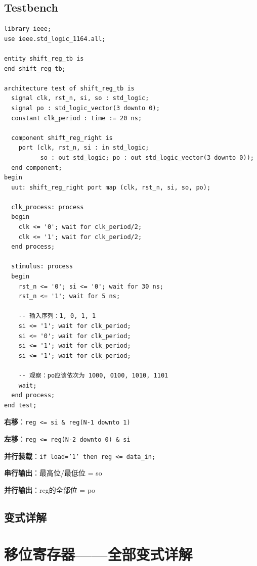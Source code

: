 \section{Testbench}

\begin{lstlisting}[caption={移位寄存器Testbench}]
library ieee;
use ieee.std_logic_1164.all;

entity shift_reg_tb is
end shift_reg_tb;

architecture test of shift_reg_tb is
  signal clk, rst_n, si, so : std_logic;
  signal po : std_logic_vector(3 downto 0);
  constant clk_period : time := 20 ns;

  component shift_reg_right is
    port (clk, rst_n, si : in std_logic;
          so : out std_logic; po : out std_logic_vector(3 downto 0));
  end component;
begin
  uut: shift_reg_right port map (clk, rst_n, si, so, po);

  clk_process: process
  begin
    clk <= '0'; wait for clk_period/2;
    clk <= '1'; wait for clk_period/2;
  end process;

  stimulus: process
  begin
    rst_n <= '0'; si <= '0'; wait for 30 ns;
    rst_n <= '1'; wait for 5 ns;

    -- 输入序列：1, 0, 1, 1
    si <= '1'; wait for clk_period;
    si <= '0'; wait for clk_period;
    si <= '1'; wait for clk_period;
    si <= '1'; wait for clk_period;

    -- 观察：po应该依次为 1000, 0100, 1010, 1101
    wait;
  end process;
end test;
\end{lstlisting}

\begin{examtip}[移位寄存器秒杀法]
\textbf{右移}：\texttt{reg <= si \& reg(N-1 downto 1)}

\textbf{左移}：\texttt{reg <= reg(N-2 downto 0) \& si}

\textbf{并行装载}：\texttt{if load='1' then reg <= data\_in;}

\textbf{串行输出}：最高位/最低位 = so

\textbf{并行输出}：reg的全部位 = po
\end{examtip}

\section{变式详解}
\chapter{移位寄存器——全部变式详解}

